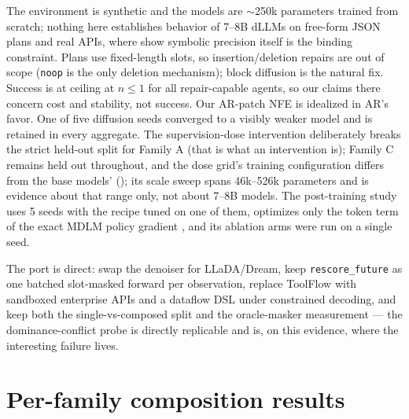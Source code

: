 \documentclass{article}
\begin{document}
The environment is synthetic and the models are $\sim$250k parameters trained from scratch; nothing
here establishes behavior of 7--8B dLLMs on free-form JSON plans and real APIs, where
\citet{bitterlesson2026} show symbolic precision itself is the binding constraint. Plans use
fixed-length slots, so insertion/deletion repairs are out of scope (\texttt{noop} is the only
deletion mechanism); block diffusion \citep{blockdiff2025} is the natural fix. Success is at ceiling
at $n{\leq}1$ for all repair-capable agents, so our claims there concern cost and stability, not
success. Our AR-patch NFE is idealized in AR's favor. One of five diffusion seeds converged to a
visibly weaker model and is retained in every aggregate. The supervision-dose intervention deliberately breaks the strict held-out split for Family A
(that is what an intervention is); Family C remains held out throughout, and the dose grid's
training configuration differs from the base models' (); its scale sweep spans
46k--526k parameters and is evidence about that range only, not about 7--8B models. The post-training study
uses 5 seeds with the recipe tuned on one of them, optimizes only the
token term of the exact MDLM policy gradient \citep{raajesh2026maskaware}, and its ablation arms
were run on a single seed.

The port is direct: swap the denoiser for LLaDA/Dream, keep \texttt{rescore\_future} as one batched
slot-masked forward per observation, replace ToolFlow with sandboxed enterprise APIs and a dataflow
DSL under constrained decoding, and keep both the single-vs-composed split and the oracle-masker
measurement --- the dominance-conflict probe is directly replicable and is, on this evidence, where
the interesting failure lives.

\small



\normalsize
\appendix
\section{Per-family composition results}\label{app:family}
\begin{table}[h]
\centering
\caption{Held-out double perturbations, split by family (5 seeds, 400 episodes/cell). Family A's
perturbations conflict (dominance rule, never demonstrated); Family C's compose independently.
Per-seed values expose the bimodality that the mean hides.}
\footnotesize
\setlength{\tabcolsep}{4pt}

\end{table}
\end{document}
